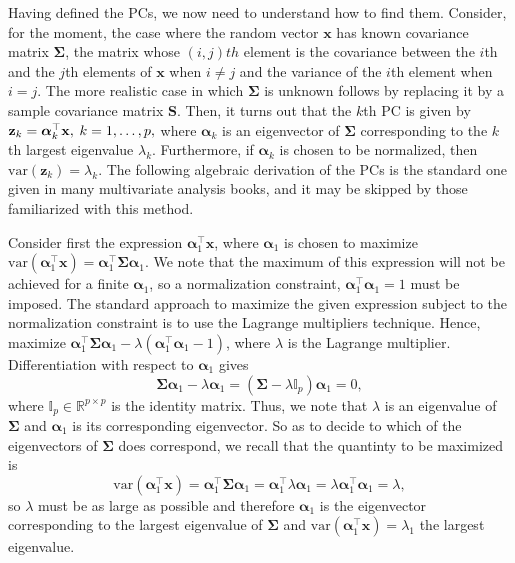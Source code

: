 \documentclass[11pt, oneside]{book}
\theoremstyle{plain}
\theoremstyle{remark}
\begin{document}
Having defined the PCs, we now need to understand how to find them. Consider,
for the moment, the case where the random vector $\mathbf{x}$ has known
covariance matrix $\mathbf{\Sigma}$, the matrix whose $(i,j)th$ element is the
covariance between the $i$th and the $j$th elements of $\mathbf{x}$ when $i\neq
j$ and the variance of the $i$th element when $i=j.$ The more realistic case in
which $\mathbf{\Sigma}$ is unknown follows by replacing it by a sample
covariance matrix $\mathbf{S}$. Then, it turns out that the $k$th PC is given by
$\mathbf{z}_k = \bm{\alpha}_k^\top\mathbf{x},\hspace{.25em} k=1,\dots,p,$ where
$\bm{\alpha}_k$ is an eigenvector of $\mathbf{\Sigma}$ corresponding to the
$k$th largest eigenvalue $\lambda_k$. Furthermore, if $\bm{\alpha}_k$ is chosen
to be normalized, then $\text{var}(\bm{z}_k) = \lambda_k$.  The following
algebraic derivation of the PCs is the standard one given in many multivariate
analysis books, and it may be skipped by those familiarized with this method.

Consider first the expression $\bm{\alpha}_1^\top\mathbf{x}$, where
$\bm{\alpha}_1$ is chosen to maximize $\text{var}(\bm{\alpha}_1^\top\mathbf{x})
= \bm{\alpha}_1^\top\mathbf{\Sigma}\bm{\alpha}_1$. We note that the maximum of
this expression will not be achieved for a finite $\bm{\alpha}_1$, so a
normalization constraint, $\bm{\alpha}_1^\top\bm{\alpha}_1 = 1$ must be imposed.
The standard approach to maximize the given expression subject to the
normalization constraint is to use the Lagrange multipliers technique. Hence,
maximize $\bm{\alpha}_1^\top\mathbf{\Sigma}\bm{\alpha}_1 -
\lambda(\bm{\alpha}_1^\top\bm{\alpha}_1 - 1)$, where $\lambda$ is the Lagrange
multiplier. Differentiation with respect to $\bm{\alpha}_1$ gives
$$\mathbf{\Sigma}\bm{\alpha}_1 - \lambda\bm{\alpha}_1 = (\mathbf{\Sigma} -
\lambda\mathbb{I}_p)\bm{\alpha}_1 = 0,$$ where
$\mathbb{I}_p\in\mathbb{R}^{p\times p}$ is the identity matrix. Thus, we note
that $\lambda$ is an eigenvalue of $\mathbf{\Sigma}$ and $\bm{\alpha}_1$ is its
corresponding eigenvector. So as to decide to which of the eigenvectors of
$\mathbf{\Sigma}$ does correspond, we recall that the quantinty to be maximized
is $$\text{var}(\bm{\alpha}_1^\top\mathbf{x}) =
\bm{\alpha}_1^\top\mathbf{\Sigma}\bm{\alpha}_1 =
\bm{\alpha}_1^\top\lambda\bm{\alpha}_1 = \lambda\bm{\alpha}_1^\top\bm{\alpha}_1
= \lambda,$$ so $\lambda$ must be as large as possible and therefore
$\mathbf{\alpha}_1$ is the eigenvector corresponding to the largest eigenvalue of
$\mathbf{\Sigma}$ and $\text{var}(\bm{\alpha}_1^\top\mathbf{x}) = \lambda_1$ the
largest eigenvalue. 
\end{document}
